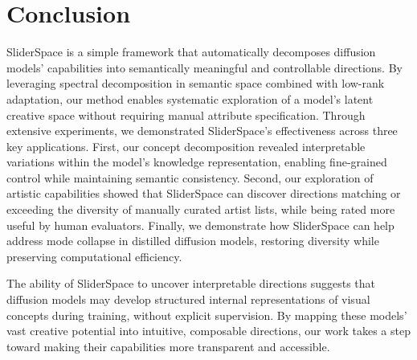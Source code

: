 

\section{Conclusion}
SliderSpace is a simple framework that automatically decomposes diffusion models' capabilities into semantically meaningful and controllable directions. By leveraging spectral decomposition in semantic space combined with low-rank adaptation, our method enables systematic exploration of a model's latent creative space without requiring manual attribute specification. Through extensive experiments, we demonstrated SliderSpace's effectiveness across three key applications. First, our concept decomposition revealed interpretable variations within the model's knowledge representation, enabling fine-grained control while maintaining semantic consistency. Second, our exploration of artistic capabilities showed that SliderSpace can discover directions matching or exceeding the diversity of manually curated artist lists, while being rated more useful by human evaluators. Finally, we demonstrate how SliderSpace can help address mode collapse in distilled diffusion models, restoring diversity while preserving computational efficiency.

The ability of SliderSpace to uncover interpretable directions suggests that diffusion models may develop structured internal representations of visual concepts during training, without explicit supervision. By mapping these models' vast creative potential into intuitive, composable directions, our work takes a step toward making their capabilities more transparent and accessible.